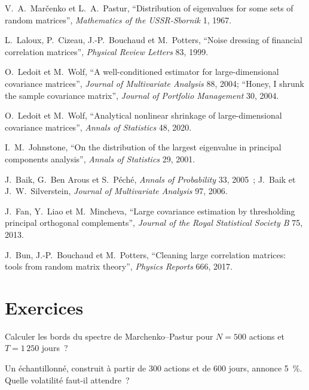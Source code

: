 \begin{omsources}
\item V.~A.~Marčenko et L.~A.~Pastur, ``Distribution of eigenvalues for some sets of random matrices'', \emph{Mathematics of the USSR-Sbornik} 1, 1967.
\item L.~Laloux, P.~Cizeau, J.-P.~Bouchaud et M.~Potters, ``Noise dressing of financial correlation matrices'', \emph{Physical Review Letters} 83, 1999.
\item O.~Ledoit et M.~Wolf, ``A well-conditioned estimator for large-dimensional covariance matrices'', \emph{Journal of Multivariate Analysis} 88, 2004; ``Honey, I shrunk the sample
covariance matrix'', \emph{Journal of Portfolio Management} 30, 2004.
\item O.~Ledoit et M.~Wolf, ``Analytical nonlinear shrinkage of large-dimensional covariance matrices'', \emph{Annals of Statistics} 48, 2020.
\item I.~M.~Johnstone, ``On the distribution of the largest eigenvalue in principal components analysis'', \emph{Annals of Statistics} 29, 2001.
\item J.~Baik, G.~Ben Arous et S.~Péché, \emph{Annals of Probability} 33, 2005~; J.~Baik et J.~W.~Silverstein, \emph{Journal of Multivariate Analysis} 97, 2006.
\item J.~Fan, Y.~Liao et M.~Mincheva, ``Large covariance estimation by thresholding principal orthogonal complements'', \emph{Journal of the Royal Statistical Society B} 75, 2013.
\item J.~Bun, J.-P.~Bouchaud et M.~Potters, ``Cleaning large correlation matrices: tools from random matrix theory'', \emph{Physics Reports} 666, 2017.
\end{omsources}

\section{Exercices}

\begin{exercise}[$\star$]\label{exo:qm:covariance-estimation-and-random-matrices:1}
Calculer les bords du spectre de Marchenko--Pastur pour $N = 500$ actions et $T = 1\,250$ jours~?
\end{exercise}

\begin{exercise}[$\star$]\label{exo:qm:covariance-estimation-and-random-matrices:2}
Un  échantillonné, construit à partir de 300 actions et de 600 jours, annonce 5~\%. Quelle volatilité faut-il attendre~?
\end{exercise}

